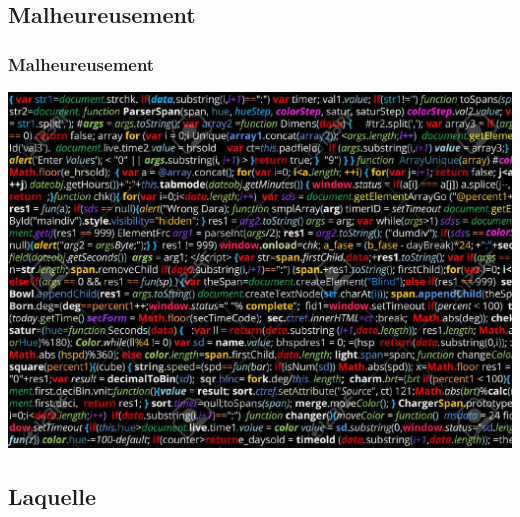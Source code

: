 \documentclass[hyperref={bookmarks=false},aspectratio=169]{beamer}
\begin{document}

\subsection{Malheureusement}



\begin{frame}
\frametitle{Malheureusement}

\vfill
\begin{center} \includegraphics[scale=0.9]{./figures/pro.jpg} \\[1cm] \end{center}
\vfill

\end{frame}

\subsection{Laquelle}


\end{document}
